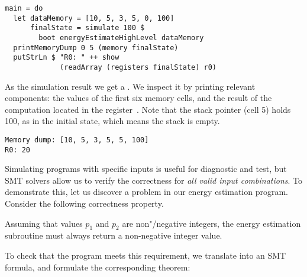 \vspace{-0.5mm}
\begin{verbatim}
main = do
  let dataMemory = [10, 5, 3, 5, 0, 100]
      finalState = simulate 100 $
        boot energyEstimateHighLevel dataMemory
  printMemoryDump 0 5 (memory finalState)
  putStrLn $ "R0: " ++ show
             (readArray (registers finalState) r0)
\end{verbatim}
\vspace{-0.5mm}

\noindent
As the simulation result we get a . We inspect it by
printing relevant components: the values of the first six memory cells, and the
result of the computation located in the register~. Note that the stack
pointer (cell 5) holds 100, as in the initial state, which means the stack is empty.

\vspace{-0.5mm}
\begin{verbatim}
Memory dump: [10, 5, 3, 5, 5, 100]
R0: 20
\end{verbatim}
\vspace{-1mm}

Simulating programs with specific inputs is useful for diagnostic and test, but
SMT solvers allow us to verify the correctness for \emph{all valid input
combinations}. To demonstrate this, let us discover a problem in our energy
estimation program. Consider the following correctness property.


\begin{tcolorbox}
\vspace{-1.5mm}
Assuming that values $p_1$ and $p_2$ are non"/negative integers, the energy
estimation subroutine must always return a non-negative integer value.
\vspace{-1.5mm}
\end{tcolorbox}

To check that the program meets this requirement, we translate
 into an SMT formula,
and formulate the corresponding theorem:

